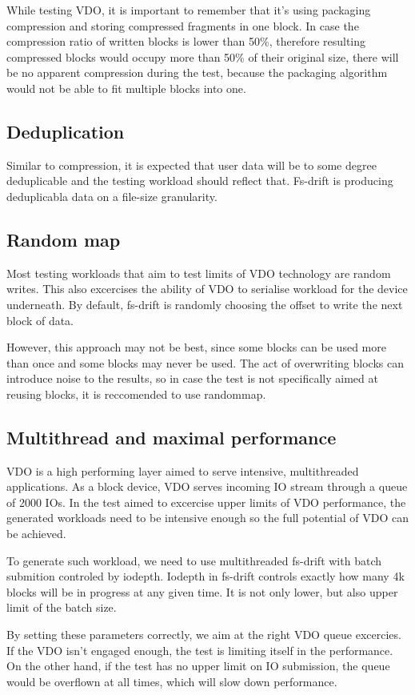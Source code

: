 \documentclass[
  color, %
  table, %
  lof,   %
  lot,   %
]{fithesis3}
\begin{document}
While testing VDO, it is important to remember that it's using packaging compression and storing compressed fragments in one block. In case the compression ratio of written blocks is lower than 50\%, therefore resulting compressed blocks would occupy more than 50\% of their original size, there will be no apparent compression during the test, because the packaging algorithm would not be able to fit multiple blocks into one.

\subsection{Deduplication}
Similar to compression, it is expected that user data will be to some degree deduplicable and the testing workload should reflect that. Fs-drift is producing deduplicabla data on a file-size granularity.

\subsection{Random map}
Most testing workloads that aim to test limits of VDO technology are random writes. This also excercises the ability of VDO to serialise workload for the device underneath. By default, fs-drift is randomly choosing the offset to write the next block of data.

However, this approach may not be best, since some blocks can be used more than once and some blocks may never be used. The act of overwriting blocks can introduce noise to the results, so in case the test is not specifically aimed at reusing blocks, it is reccomended to use randommap.

\subsection{Multithread and maximal performance}
VDO is a high performing layer aimed to serve intensive, multithreaded applications. As a block device, VDO serves incoming IO stream through a queue of 2000 IOs. In the test aimed to excercise upper limits of VDO performance, the generated workloads need to be intensive enough so the full potential of VDO can be achieved.

To generate such workload, we need to use multithreaded fs-drift with batch submition controled by iodepth. Iodepth in fs-drift controls exactly how many 4k blocks will be in progress at any given time. It is not only lower, but also upper limit of the batch size.

By setting these parameters correctly, we aim at the right VDO queue excercies. If the VDO isn't engaged enough, the test is limiting itself in the performance. On the other hand, if the test has no upper limit on IO submission, the queue would be overflown at all times, which will slow down performance.
\end{document}

